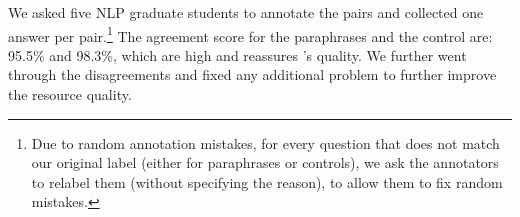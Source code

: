 We asked five NLP graduate students to  annotate the pairs and collected one answer per pair.\footnote{Due to random annotation mistakes, for every question
that does not match our original label (either for
paraphrases or controls), we ask the annotators to relabel
them (without specifying the reason), to allow them to fix
random mistakes.}
The agreement score for the paraphrases and the control are: 95.5\% and 98.3\%, which are high and reassures \resource's quality.
We further went through the disagreements  %
and fixed any additional problem %
to further improve the resource quality.
% 



